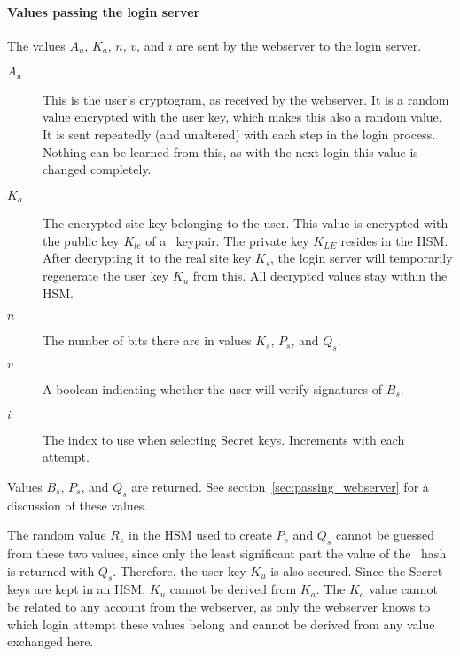 \paragraph{Values passing the login server}
The values $A_u$, $K_a$, $n$, $v$, and $i$ are sent by the webserver to the login server.
\begin{description}
\item[$A_u$]	This is the user's cryptogram, as received by the webserver.
	It is a random value encrypted with the user key,
	which makes this also a random value.
	It is sent repeatedly
	(and unaltered)
	with each step in the login process.
	Nothing can be learned from this,
	as with the next login this value is changed completely.
\item[$K_a$]	The encrypted site key belonging to the user.
	This value is encrypted with the public key $K_{le}$ of a \RSA\ keypair.
	The private key $K_{LE}$ resides in the HSM.
	After decrypting it to the real site key $K_s$,
	the login server will temporarily regenerate the user key $K_u$ from this.
	All decrypted values stay within the HSM.
\item[$n$]	The number of bits there are in values $K_s$, $P_s$, and $Q_s$.
\item[$v$]	A boolean indicating whether the user will verify signatures of $B_s$.
\item[$i$]	The index to use when selecting Secret keys.
	Increments with each attempt.
\end{description}
Values $B_s$, $P_s$, and $Q_s$ are returned.
See section~\vref{sec:passing_webserver} for a discussion of these values.
\par
The random value $R_s$ in the HSM used to create $P_s$ and $Q_s$ cannot be guessed from these two values,
since only the least significant part the value of the \SHA\ hash is returned with $Q_s$.
Therefore, the user key $K_u$ is also secured.
Since the Secret keys are kept in an HSM,
$K_u$ cannot be derived from $K_a$.
The $K_a$ value cannot be related to any account from the webserver,
as only the webserver knows to which login attempt these values belong
and cannot be derived from any value exchanged here.

